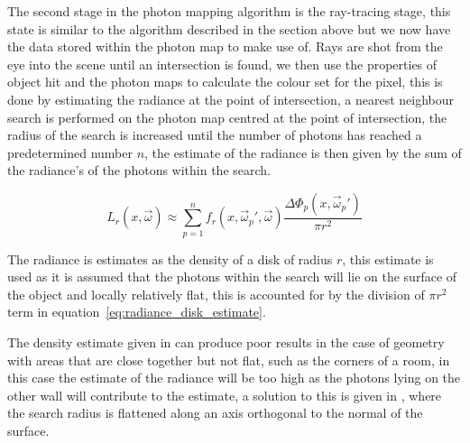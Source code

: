 The second stage in the photon mapping algorithm is the ray-tracing stage, this state is similar
to the algorithm described in the section above but we now have the data stored within the photon map to make
use of. Rays are shot from the eye into the scene until an intersection is found, we then use
the properties of object hit and the photon maps to calculate the colour set for the pixel, this
is done by estimating the radiance at the point of intersection, a nearest neighbour search is
performed on the photon map centred at the point of intersection, the radius of the search is
increased until the number of photons has reached a predetermined number $n$, the estimate of the
radiance is then given by the sum of the radiance's of the photons within the search.

\begin{equation}
\label{eq:radiance_disk_estimate}
L_{r}(x, \vec{\omega})
\approx
\sum_{p=1}^n
f_{r}(x,\vec{\omega}_{p}', \vec{\omega})
\frac
{
	\Delta\Phi_{p}(x, \vec{\omega}_{p}')
}
{
\pi r^{2}
}
\end{equation}

The radiance is estimates as the density of a disk of radius $r$, this estimate is used as it is
assumed that the photons within the search will lie on the surface of the object and locally 
relatively flat, this is accounted for by the division of $\pi r^2$ term in equation~\ref{eq:radiance_disk_estimate}.

The density estimate given in \cite{Jensen96a} can produce poor results in the case of geometry with
areas that are close together but not flat, such as the corners of a room, in this case the
estimate of the radiance will be too high as the photons lying on the other wall will contribute to
the estimate, a solution to this is given in \cite{JensenBook}, where the search radius is flattened along
an axis orthogonal to the normal of the surface.
